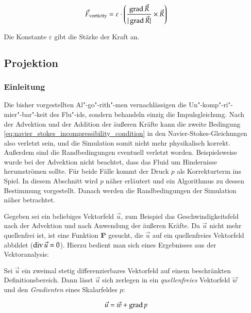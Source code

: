 \begin{equation}
\label{eq:stam_vorticity_confinement}
\vec{F}_{\textnormal{vorticity}}
=
\varepsilon \cdot
\left(
	\frac
	{
		\operatorname*{grad} \vec{R}
	}
	{
		|\operatorname*{grad} \vec{R}|
	}
	\times
	\vec{R}
\right)
\end{equation}

Die Konstante $\varepsilon$ gibt die Stärke der Kraft an.

\subsection{Projektion}
\label{sec:stam_projection}

\subsubsection{Einleitung}

Die bisher vorgestellten Al"-go"-rith"-men vernachlässigen die
Un"-komp"-ri"-mier"-bar"-keit des Flu"-ids, sondern behandeln einzig
die Impulsgleichung. Nach der Advektion und der Addition der äußeren
Kräfte kann die zweite Bedingung
\ref{eq:navier_stokes_incompressibility_condition} in den
Navier-Stokes-Gleichungen also verletzt sein, und die Simulation somit
nicht mehr physikalisch korrekt. Außerdem sind die Randbedingungen
eventuell verletzt worden. Beispielsweise wurde bei der Advektion
nicht beachtet, dass das Fluid um Hindernisse herumströmen sollte. Für
beide Fälle kommt der Druck $p$ als Korrekturterm ins Spiel. In diesem
Abschnitt wird $p$ näher erläutert und ein Algorithmus zu dessen
Bestimmung vorgestellt. Danach werden die Randbedingungen der
Simulation näher betrachtet.

Gegeben sei ein beliebiges Vektorfeld $\vec{u}$, zum Beispiel das
Geschwindigkeitsfeld nach der Advektion und nach Anwendung der äußeren
Kräfte. Da $\vec{u}$ nicht mehr quellenfrei ist, ist eine Funktion
$\mathbb{P}$ gesucht, die $\vec{u}$ auf ein quellenfreies
Vektorfeld abbildet ($\operatorname*{div} \vec{u} = 0$). Hierzu
bedient man sich eines Ergebnisses aus der Vektoranalysis:

\begin{PimiddySatz}
Sei $\vec{u}$ ein zweimal stetig differenzierbares Vektorfeld auf einem
beschränkten Definitionsbereich. Dann lässt $\vec{u}$ sich zerlegen in
ein \emph{quellenfreies} Vektorfeld $\vec{w}$ und den \emph{Gradienten}
eines Skalarfeldes $p$:

\begin{equation}
\label{eq:stam_helmholtz_equation}
\vec{u} = \vec{w} + \operatorname*{grad} p
\end{equation}
\end{PimiddySatz}

